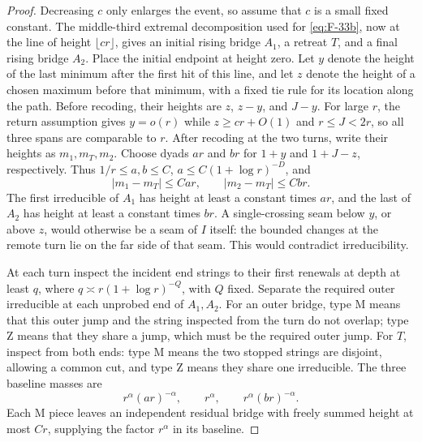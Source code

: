 \begin{proof}
Decreasing $c$ only enlarges the event, so assume that $c$ is a small
fixed constant. The middle-third extremal decomposition used for
\eqref{eq:F-33b}, now at the line of height $\lfloor cr\rfloor$, gives an
initial rising bridge $A_1$, a retreat $T$, and a final rising bridge
$A_2$. Place the initial endpoint at height zero. Let $y$ denote the height
of the last minimum after the first hit of this line, and let $z$
denote the height of a chosen maximum before that minimum, with a fixed
tie rule for its location along the path. Before recoding, their heights are $z$, $z-y$, and $J-y$.
For large $r$, the return assumption gives $y=o(r)$ while $z\ge cr+O(1)$
and $r\le J<2r$, so all three spans are comparable to $r$.
After recoding at the two turns, write their heights as $m_1,m_T,m_2$.
Choose dyads $ar$ and $br$ for $1+y$ and $1+J-z$, respectively. Thus
$1/r\le a,b\le C$, $a\le C(1+\log r)^{-D}$, and
\[
 |m_1-m_T|\le Car,\qquad |m_2-m_T|\le Cbr.
\]
The first irreducible of $A_1$ has height at least a constant times $ar$,
and the last of $A_2$ has height at least a constant times $br$. A
single-crossing seam below $y$, or above $z$, would otherwise be a seam
of $I$ itself: the bounded changes at the remote turn lie on the far side
of that seam. This would contradict irreducibility.

At each turn inspect the incident end strings to their first renewals
at depth at least $q$, where
$q\asymp r(1+\log r)^{-Q}$, with $Q$ fixed. Separate the required outer
irreducible at each unprobed end of $A_1,A_2$. For an outer bridge, type
$\mathrm M$ means that this outer jump and the string inspected from the
turn do not overlap; type $\mathrm Z$ means that they share a jump, which
must be the required outer jump. For $T$, inspect from both ends: type $\mathrm M$ means the two
stopped strings are disjoint, allowing a common cut, and type
$\mathrm Z$ means they share one irreducible. The three baseline masses are
\[
 r^\alpha(ar)^{-\alpha},\qquad r^\alpha,
 \qquad r^\alpha(br)^{-\alpha}.
\]
Each $\mathrm M$ piece leaves an independent residual bridge with freely
summed height at most $Cr$, supplying the factor $r^\alpha$ in its
baseline.


\end{proof}
